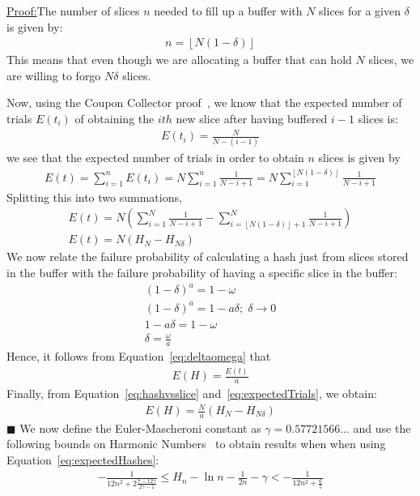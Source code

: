 \documentclass[runningheads]{llncs}
\newenvironment{claimproof}[1]{\par\noindent\underline{Proof:}\space#1}{\hfill $\blacksquare$}
\begin{document}
\begin{claimproof}
The number of slices $n$ needed to fill up a buffer with $N$ slices for a given $\delta$ is given by:
\begin{gather}
	n = \left \lfloor{N(1-\delta)}\right \rfloor  %
\end{gather}
This means that even though we are allocating a buffer that can hold $N$ slices, we are willing to forgo $N\delta$ slices.

Now, using the Coupon Collector proof~\cite{couponCollector}, we know that the expected number of trials $E(t_i)$ of obtaining the $ith$ new slice after having buffered $i-1$ slices is:\\
\begin{gather}
	E(t_i) = \frac{N}{N-(i-1)}
\end{gather}
we see that the expected number of trials in order to obtain $n$ slices is given by
\begin{gather}
	E(t) = \sum_{i=1}^{n}E(t_i) = N\sum_{i=1}^{n}\frac{1}{N-i+1} = N\sum_{i=1}^{\left \lfloor{N(1-\delta)}\right \rfloor}\frac{1}{N-i+1}
\end{gather}
Splitting this into two summations,
\begin{gather}
	E(t) = N(\sum_{i=1}^{N}\frac{1}{N-i+1} - \sum_{i=\left \lfloor{N(1-\delta)}\right \rfloor+1}^{N}\frac{1}{N-i+1}) \\
    \label{eq:expectedTrials}
    E(t) = N(H_{N} -H_{N\delta})
\end{gather}
We now relate the failure probability of calculating a hash just from slices stored in the buffer with the failure probability of having a specific slice in the buffer:
\begin{gather}
	(1-\delta)^a = 1-\omega \\
    (1-\delta)^a = 1-a\delta;\;\delta \to 0 \\
	1-a\delta = 1-\omega \\
    \label{eq:deltaomega}
	\delta = \frac{\omega}{a}
\end{gather}
Hence, it follows from Equation~\ref{eq:deltaomega} that 
\begin{gather}
	\label{eq:hashvsslice}
	E(H) = \frac{E(t)}{a}
\end{gather}
Finally, from Equation~\ref{eq:hashvsslice} and~\ref{eq:expectedTrials}, we obtain:
\begin{gather}
    \label{eq:expectedHashes}
	E(H) = \frac{N}{a}(H_{N} -H_{N\delta})
\end{gather}    
\end{claimproof}
We now define the Euler-Mascheroni constant as $\gamma = 0.57721566...$ and use the following bounds on Harmonic Numbers~\cite{harmonicNumber} to obtain results when when using Equation~\ref{eq:expectedHashes}:
\begin{gather}
    \label{eq:boundHarmonic}
	-\frac{1}{12n^2+{2\frac{7-12\gamma}{2\gamma-1}}}\le H_n-\ln n-\frac1{2n}-\gamma<-\frac{1}{12n^2+\frac{6}{5}}
\end{gather}  
\end{document}
